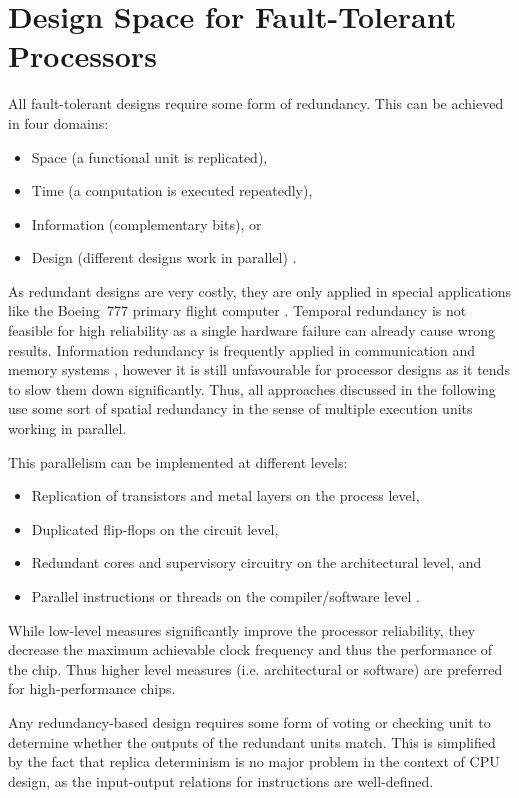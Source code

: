 \documentclass[conference]{IEEEtran}
\begin{document}
\section{Design Space for Fault-Tolerant Processors}
\label{sec:design_space}

All fault-tolerant designs require some form of redundancy. This can be achieved in four domains:

\begin{itemize}
	\item Space (a functional unit is replicated),
	\item Time (a computation is executed repeatedly),
	\item Information (complementary bits), or
	\item Design (different designs work in parallel) \cite{Sorin2009}.
\end{itemize}

As redundant designs are very costly, they are only applied in special applications like the Boeing~777 primary flight computer \cite{Yeh1996}. Temporal redundancy is not feasible for high reliability as a single hardware failure can already cause wrong results. Information redundancy is frequently applied in communication and memory systems \cite{Sorin2009}, however it is still unfavourable for processor designs as it tends to slow them down significantly. Thus, all approaches discussed in the following use some sort of spatial redundancy in the sense of multiple execution units working in parallel.

This parallelism can be implemented at different levels:
\begin{itemize}
	\item Replication of transistors and metal layers on the process level,
	\item Duplicated flip-flops on the circuit level,
	\item Redundant cores and supervisory circuitry on the architectural level, and
	\item Parallel instructions or threads on the compiler/software level \cite{Iturbe2019}.
\end{itemize}

While low-level measures significantly improve the processor reliability, they decrease the maximum achievable clock frequency and thus the performance of the chip. Thus higher level measures (i.e. architectural or software) are preferred for high-performance chips.

Any redundancy-based design requires some form of voting or checking unit to determine whether the outputs of the redundant units match. This is simplified by the fact that replica determinism \cite{Poledna2000} is no major problem in the context of CPU design, as the input-output relations for instructions are well-defined.
\end{document}

